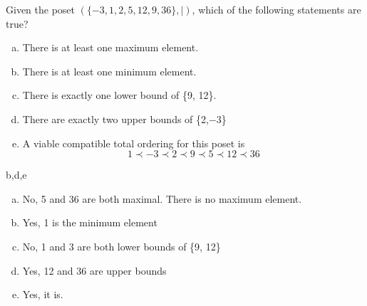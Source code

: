 Given the poset $(\{-3, 1, 2,  5, 12, 9, 36\}, |)$, which of the following statements are true?

\begin{enumerate}[(a)]
	\item  
    There is at least one maximum element.
    
	\item 
    There is at least one minimum element.
    
	\item 
    There is exactly one lower bound of \{9, 12\}. 
    
	\item 
    There are exactly two upper bounds of \{2,$-3$\}
    
	\item 
    A viable compatible total ordering for this poset is
    \[
        1 \prec -3 \prec 2 \prec 9 \prec 5 \prec 12 \prec 36 
    \]

\end{enumerate}
\begin{solution}

b,d,e


\begin{enumerate}[(a)]
    \item 
    No, 5 and 36 are both maximal. There is no maximum element.
    \item
    Yes, 1 is the minimum element
    \item
    No, 1 and 3 are both lower bounds of \{9, 12\}
    \item
    Yes, 12 and 36 are upper bounds
    \item
    Yes, it is.
\end{enumerate}


\end{solution}


